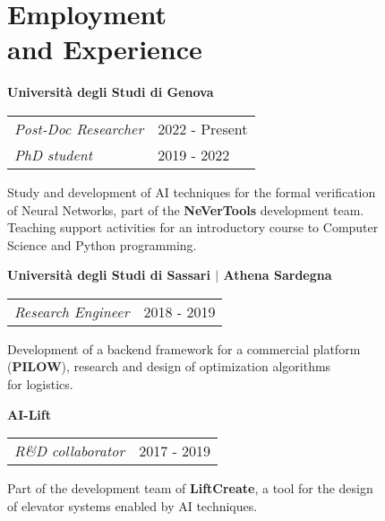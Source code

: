 \section{\sc Employment \\and Experience}

{\bf{Universit\`a degli Studi di Genova}}\\
\begin{tabular}{@{}p{4in}p{2in}}
	\textit{Post-Doc Researcher} & 2022 - Present\\
	\textit{PhD student} & 2019 - 2022\\
\end{tabular}

\begin{list1}
	\item[] Study and development of AI techniques for the formal verification\\
	of Neural Networks, part of the \textbf{NeVerTools} development team.\\
	Teaching support activities for an introductory course to Computer\\
	Science and Python programming.
\end{list1}


{\bf{Universit\`a degli Studi di Sassari $\vert$ Athena Sardegna}}\\
\begin{tabular}{@{}p{4in}p{2in}}
	\textit{Research Engineer} & 2018 - 2019\\
\end{tabular}

\begin{list1}
	\item[] Development of a backend framework for a commercial platform\\
	(\textbf{PILOW}), research and design of optimization algorithms\\
	for logistics.
\end{list1}


{\bf{AI-Lift}}\\
\begin{tabular}{@{}p{4in}p{2in}}
	\textit{R\&D collaborator}  & 2017 - 2019\\
\end{tabular}

\begin{list1}
	\item[] Part of the development team of \textbf{LiftCreate}, a tool for the design\\
	of elevator systems enabled by AI techniques.
\end{list1}
